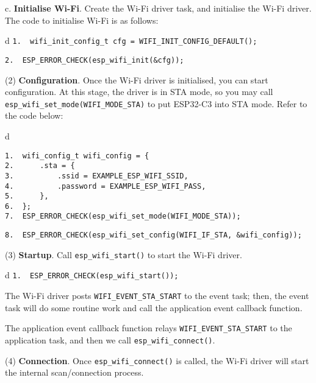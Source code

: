 \documentclass[a4paper,12pt]{book}
\begin{document}
c. \textbf{Initialise Wi-Fi}. Create the Wi-Fi driver task, and initialise the Wi-Fi driver. The code to initialise Wi-Fi is as follows:

\begin{codebloc}
\begin{tabular}{d}
\verb|1.  wifi_init_config_t cfg = WIFI_INIT_CONFIG_DEFAULT();|

\verb|2.  ESP_ERROR_CHECK(esp_wifi_init(&cfg));|
\end{tabular}
\end{codebloc}

(2) \textbf{Configuration}. Once the Wi-Fi driver is initialised, you can start configuration. At this stage, the driver is in STA mode, so you may call \verb|esp_wifi_set_mode(WIFI_MODE_STA)| to put ESP32-C3 into STA mode. Refer to the code below:

\begin{codebloc}
\begin{tabular}{d}
\vspace{2pt}
\begin{verbatim}
1.  wifi_config_t wifi_config = {
2.      .sta = {
3.          .ssid = EXAMPLE_ESP_WIFI_SSID,
4.          .password = EXAMPLE_ESP_WIFI_PASS,
5.      },
6.  };
7.  ESP_ERROR_CHECK(esp_wifi_set_mode(WIFI_MODE_STA));
\end{verbatim}
\verb|8.  ESP_ERROR_CHECK(esp_wifi_set_config(WIFI_IF_STA, &wifi_config));|
\end{tabular}
\end{codebloc}

(3) \textbf{Startup}. Call \verb|esp_wifi_start()| to start the Wi-Fi driver.

\begin{codebloc}
\begin{tabular}{d}
\verb|1.  ESP_ERROR_CHECK(esp_wifi_start());|
\end{tabular}
\end{codebloc}

The Wi-Fi driver posts \verb|WIFI_EVENT_STA_START| to the event task; then, the event task will do some routine work and call the application event callback function.
    
The application event callback function relays \verb|WIFI_EVENT_STA_START| to the application task, and then we call \verb|esp_wifi_connect()|.

(4) \textbf{Connection}. Once \verb|esp_wifi_connect()| is called, the Wi-Fi driver will start the internal scan/connection process.
\end{document}
